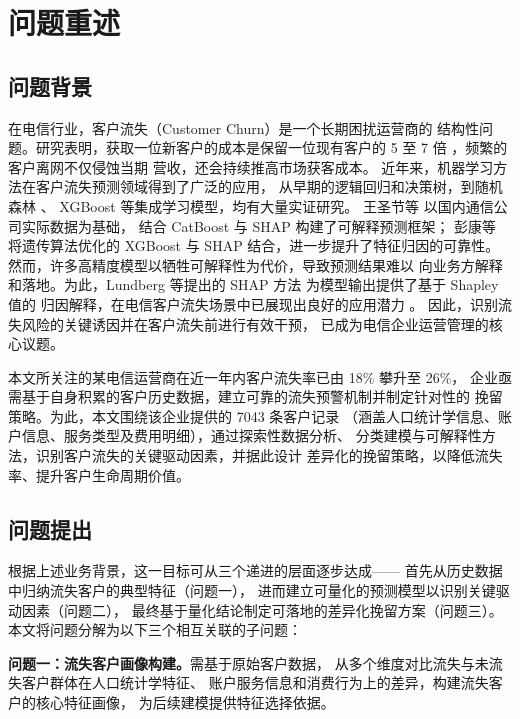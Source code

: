 \section{问题重述}

\subsection{问题背景}

在电信行业，客户流失（Customer Churn）是一个长期困扰运营商的
结构性问题。研究表明，获取一位新客户的成本是保留一位现有客户的
5 至 7 倍 \cite{reichheld1996zero}，频繁的客户离网不仅侵蚀当期
营收，还会持续推高市场获客成本。
近年来，机器学习方法在客户流失预测领域得到了广泛的应用，
从早期的逻辑回归和决策树，到随机森林 \cite{breiman2001random}、
XGBoost \cite{chen2016xgboost} 等集成学习模型，均有大量实证研究。
王圣节等 \cite{wang2024telecom} 以国内通信公司实际数据为基础，
结合 CatBoost 与 SHAP 构建了可解释预测框架；
彭康等 \cite{peng2022research} 将遗传算法优化的 XGBoost 与 SHAP
结合，进一步提升了特征归因的可靠性。
然而，许多高精度模型以牺牲可解释性为代价，导致预测结果难以
向业务方解释和落地。为此，Lundberg 等提出的 SHAP 方法
\cite{lundberg2017unified} 为模型输出提供了基于 Shapley 值的
归因解释，在电信客户流失场景中已展现出良好的应用潜力
\cite{poudel2024explaining,sinaga2023understanding}。
因此，识别流失风险的关键诱因并在客户流失前进行有效干预，
已成为电信企业运营管理的核心议题。

本文所关注的某电信运营商在近一年内客户流失率已由 18\% 攀升至 26\%，
企业亟需基于自身积累的客户历史数据，建立可靠的流失预警机制并制定针对性的
挽留策略。为此，本文围绕该企业提供的 7043 条客户记录
（涵盖人口统计学信息、账户信息、服务类型及费用明细），通过探索性数据分析、
分类建模与可解释性方法，识别客户流失的关键驱动因素，并据此设计
差异化的挽留策略，以降低流失率、提升客户生命周期价值。

\subsection{问题提出}

根据上述业务背景，这一目标可从三个递进的层面逐步达成——
首先从历史数据中归纳流失客户的典型特征（问题一），
进而建立可量化的预测模型以识别关键驱动因素（问题二），
最终基于量化结论制定可落地的差异化挽留方案（问题三）。
本文将问题分解为以下三个相互关联的子问题：

\textbf{问题一：流失客户画像构建。}需基于原始客户数据，
从多个维度对比流失与未流失客户群体在人口统计学特征、
账户服务信息和消费行为上的差异，构建流失客户的核心特征画像，
为后续建模提供特征选择依据。

